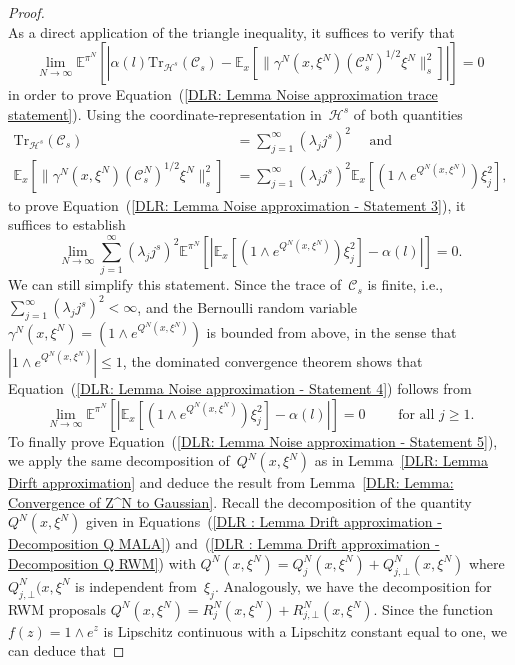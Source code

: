 \begin{proof}
\begin{equation}
  \end{equation}
  As a direct application of the triangle inequality, it suffices to verify that
  \begin{equation}
    \label{DLR: Lemma Noise approximation - Statement 3}
    \lim_{N \to \infty}  \mathbb{E}^{\pi^N}[| \alpha(l)  \text{Tr}_{\mathcal{H}^s} (\mathcal{C}_s) - \mathbb{E}_x[ \| \gamma^N(x, \xi^N) (\mathcal{C}_s^N)^{1/2} \xi^N \|_s^2] |] = 0
  \end{equation}
  in order to prove Equation~(\ref{DLR: Lemma Noise approximation trace statement}). Using the coordinate-representation in~$\mathcal{H}^s$ of both quantities 
  \begin{align*}
    \text{Tr}_{\mathcal{H}^s} (\mathcal{C}_s) & = \sum_{j=1}^{\infty} (\lambda_j j^s)^2  \quad \text{ and }\\ 
    \mathbb{E}_x[ \| \gamma^N(x, \xi^N) (\mathcal{C}_s^N)^{1/2} \xi^N \|_s^2] & = \sum_{j=1}^{\infty} (\lambda_j j^s)^2 \mathbb{E}_x[(1 \wedge e^{Q^N(x, \xi^N)})\xi_j^2],
  \end{align*}
  to prove Equation~(\ref{DLR: Lemma Noise approximation - Statement 3}), it suffices to establish
  \begin{equation}
    \label{DLR: Lemma Noise approximation - Statement 4}
    \lim_{N \to \infty} \sum_{j=1}^{\infty} (\lambda_j j^s)^2 \mathbb{E}^{\pi^N}[|\mathbb{E}_x[(1 \wedge e^{Q^N(x, \xi^N)})\xi_j^2] - \alpha(l)|] = 0.
  \end{equation}
  We can still simplify this statement. Since the trace of~$\mathcal{C}_s$ is finite, i.e., $ \sum_{j=1}^{\infty} (\lambda_j j^s)^2 < \infty $, and the Bernoulli random variable~$\gamma^N(x, \xi^N) = (1 \wedge e^{Q^N(x, \xi^N)})$ is bounded from above, in the sense that $|1 \wedge e^{Q^N(x, \xi^N)}| \leq 1$, the dominated convergence theorem shows that Equation~(\ref{DLR: Lemma Noise approximation - Statement 4}) follows from
  \begin{equation}
   \label{DLR: Lemma Noise approximation - Statement 5}
   \lim_{N \to \infty}  \mathbb{E}^{\pi^N}[|\mathbb{E}_x[(1 \wedge e^{Q^N(x, \xi^N)})\xi_j^2] - \alpha(l)|] = 0 \qquad \text{ for all } j \geq 1.
  \end{equation}
  To finally prove Equation~(\ref{DLR: Lemma Noise approximation - Statement 5}), we apply the same decomposition of~$Q^N(x, \xi^N)$ as in Lemma~\ref{DLR: Lemma Dirft approximation} and deduce the result from Lemma~\ref{DLR: Lemma: Convergence of Z^N to Gaussian}. Recall the decomposition of the quantity~$Q^N(x, \xi^N)$ given in Equations~(\ref{DLR : Lemma Drift approximation - Decomposition Q MALA}) and~(\ref{DLR : Lemma Drift approximation - Decomposition Q RWM}) with $Q^N(x, \xi^N) = Q^N_j(x, \xi^N) + Q^N_{j, \bot}(x, \xi^N)$ where~$Q^N_{j, \bot}(x, \xi^N$ is independent from~$\xi_j$. Analogously, we have the decomposition for RWM proposals $Q^N(x, \xi^N) = R^N_j(x, \xi^N) + R^N_{j, \bot}(x, \xi^N)$. Since the function~$ f (z) =  1 \wedge e^{z}$ is Lipschitz continuous with a Lipschitz constant equal to one, we can deduce that

\end{proof}
